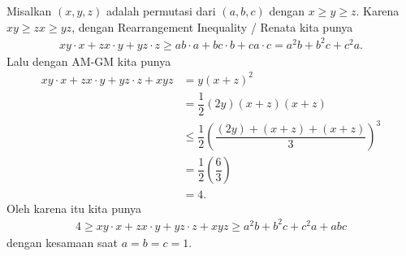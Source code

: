 
\begin{solusi}
    Misalkan $(x,y,z)$ adalah permutasi dari $(a,b,c)$ dengan $x \ge y \ge z$. Karena $xy \ge zx \ge yz$, dengan Rearrangement Inequality / Renata kita punya
    \begin{align*}
        xy \cdot x + zx \cdot y + yz \cdot z \ge ab\cdot a + bc \cdot b + ca \cdot c = a^2 b + b^2 c + c^2 a.
    \end{align*}
    Lalu dengan AM-GM kita punya
    \begin{align*}
        xy \cdot x + zx \cdot y + yz \cdot z + xyz &= y(x+z)^2\\
        &= \dfrac{1}{2}(2y)(x+z)(x+z)\\
        &\le \dfrac{1}{2}\left(\dfrac{(2y)+(x+z)+(x+z)}{3}\right)^3\\
        &= \dfrac{1}{2}\left(\dfrac{6}{3}\right)\\
        &= 4.
    \end{align*}
    Oleh karena itu kita punya
    \begin{align*}
        4 \ge xy \cdot x + zx \cdot y + yz \cdot z + xyz \ge a^2 b + b^2 c + c^2 a + abc
    \end{align*}
    dengan kesamaan saat $a=b=c=1$.
\end{solusi}